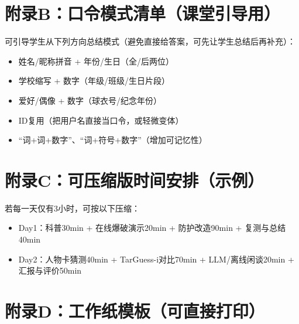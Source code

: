 \documentclass[UTF8,a4paper,12pt]{ctexart}
\begin{document}
\section{附录B：口令模式清单（课堂引导用）}
可引导学生从下列方向总结模式（避免直接给答案，可先让学生总结后再补充）：
\begin{itemize}
  \item 姓名/昵称拼音 + 年份/生日（全/后两位）
  \item 学校缩写 + 数字（年级/班级/生日片段）
  \item 爱好/偶像 + 数字（球衣号/纪念年份）
  \item ID复用（把用户名直接当口令，或轻微变体）
  \item ``词+词+数字''、``词+符号+数字''（增加可记忆性）
\end{itemize}

\section{附录C：可压缩版时间安排（示例）}
若每一天仅有3小时，可按以下压缩：
\begin{itemize}
  \item Day1：科普30min + 在线爆破演示20min + 防护改造90min + 复测与总结40min
  \item Day2：人物卡猜测40min + TarGuess-i对比70min + LLM/离线闲谈20min + 汇报与评价50min
\end{itemize}

\section{附录D：工作纸模板（可直接打印）}
\end{document}
